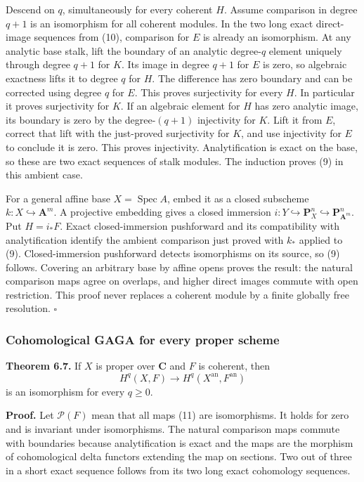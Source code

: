 \documentclass[11pt]{article}
\begin{document}
Descend on \(q\), simultaneously for every coherent \(H\). Assume
comparison in degree \(q+1\) is an isomorphism for all coherent modules.
In the two long exact direct-image sequences from (10), comparison for
\(E\) is already an isomorphism. At any analytic base stalk, lift the
boundary of an analytic degree-\(q\) element uniquely through degree
\(q+1\) for \(K\). Its image in degree \(q+1\) for \(E\) is zero, so
algebraic exactness lifts it to degree \(q\) for \(H\). The difference
has zero boundary and can be corrected using degree \(q\) for \(E\).
This proves surjectivity for every \(H\). In particular it proves
surjectivity for \(K\). If an algebraic element for \(H\) has zero
analytic image, its boundary is zero by the degree-\((q+1)\) injectivity
for \(K\). Lift it from \(E\), correct that lift with the just-proved
surjectivity for \(K\), and use injectivity for \(E\) to conclude it is
zero. This proves injectivity. Analytification is exact on the base, so
these are two exact sequences of stalk modules. The induction proves (9)
in this ambient case.

For a general affine base \(X=\operatorname{Spec}A\), embed it as a
closed subscheme \(k:X\hookrightarrow\mathbf A^m\). A projective
embedding gives a closed immersion
\(i:Y\hookrightarrow\mathbf P^n_X\hookrightarrow\mathbf P^n_{\mathbf A^m}\).
Put \(H=i_*F\). Exact closed-immersion pushforward and its compatibility
with analytification identify the ambient comparison just proved with
\(k_*\) applied to (9). Closed-immersion pushforward detects
isomorphisms on its source, so (9) follows. Covering an arbitrary base
by affine opens proves the result: the natural comparison maps agree on
overlaps, and higher direct images commute with open restriction. This
proof never replaces a coherent module by a finite globally free
resolution. \(\square\)

\subsubsection{Cohomological GAGA for every proper
scheme}\label{cohomological-gaga-for-every-proper-scheme}

\textbf{Theorem 6.7.} If \(X\) is proper over \(\mathbf C\) and \(F\) is
coherent, then \[
H^q(X,F)\longrightarrow H^q(X^{\mathrm{an}},F^{\mathrm{an}})
\tag{11}
\] is an isomorphism for every \(q\ge0\).

\textbf{Proof.} Let \(\mathcal P(F)\) mean that all maps (11) are
isomorphisms. It holds for zero and is invariant under isomorphisms. The
natural comparison maps commute with boundaries because analytification
is exact and the maps are the morphism of cohomological delta functors
extending the map on sections. Two out of three in a short exact
sequence follows from its two long exact cohomology sequences.
\end{document}
